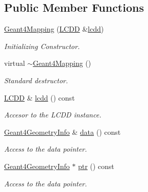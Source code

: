 \subsection*{Public Member Functions}
\begin{DoxyCompactItemize}
\item 
\hyperlink{class_d_d4hep_1_1_simulation_1_1_geant4_mapping_a60aefec5f9d5816368c7e3db4065b546}{Geant4\+Mapping} (\hyperlink{class_d_d4hep_1_1_simulation_1_1_geant4_mapping_a7b098323f9ea570a13d220fe3f09da41}{L\+C\+DD} \&\hyperlink{class_d_d4hep_1_1_simulation_1_1_geant4_mapping_aa7dde906292e738792cfeb358785d611}{lcdd})
\begin{DoxyCompactList}\small\item\em Initializing Constructor. \end{DoxyCompactList}\item 
virtual \hyperlink{class_d_d4hep_1_1_simulation_1_1_geant4_mapping_a497e1e6164765a418d66430d4d404708}{$\sim$\+Geant4\+Mapping} ()
\begin{DoxyCompactList}\small\item\em Standard destructor. \end{DoxyCompactList}\item 
\hyperlink{class_d_d4hep_1_1_simulation_1_1_geant4_mapping_a7b098323f9ea570a13d220fe3f09da41}{L\+C\+DD} \& \hyperlink{class_d_d4hep_1_1_simulation_1_1_geant4_mapping_aa7dde906292e738792cfeb358785d611}{lcdd} () const
\begin{DoxyCompactList}\small\item\em Accesor to the L\+C\+DD instance. \end{DoxyCompactList}\item 
\hyperlink{class_d_d4hep_1_1_simulation_1_1_geant4_geometry_info}{Geant4\+Geometry\+Info} \& \hyperlink{class_d_d4hep_1_1_simulation_1_1_geant4_mapping_a6a078e8ed49fe6741f932d8dc5d3acb5}{data} () const
\begin{DoxyCompactList}\small\item\em Access to the data pointer. \end{DoxyCompactList}\item 
\hyperlink{class_d_d4hep_1_1_simulation_1_1_geant4_geometry_info}{Geant4\+Geometry\+Info} $\ast$ \hyperlink{class_d_d4hep_1_1_simulation_1_1_geant4_mapping_a8b2d3c35a3daa1676bd2a79cb217d5e5}{ptr} () const
\begin{DoxyCompactList}\small\item\em Access to the data pointer. \end{DoxyCompactList}\item 

\end{DoxyCompactItemize}
